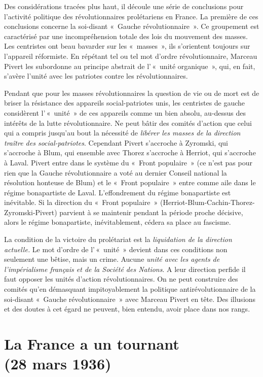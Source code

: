 \documentclass[french,twoside]{book} %
\newcommand\chapteropen{} %
\newcommand\chapterclose{} %
\begin{document}
Des considérations tracées plus haut, il découle une série de conclusions pour l’activité politique des révolutionnaires prolétariens en France. La première de ces conclusions concerne la soi-disant « Gauche révolutionnaire ». Ce groupement est caractérisé par une incompréhension totale des lois du mouvement des masses. Les centristes ont beau bavarder sur les « masses », ils s’orientent toujours sur l’appareil réformiste. En répétant tel ou tel mot d’ordre révolutionnaire, Marceau Pivert les subordonne au principe abstrait de l’ « unité organique », qui, en fait, s’avère l’unité avec les patriotes contre les révolutionnaires.\par
Pendant que pour les masses révolutionnaires la question de vie ou de mort est de briser la résistance des appareils social-patriotes unis, les centristes de gauche considèrent l’ « unité » de ces appareils comme un bien absolu, au-dessus des intérêts de la lutte révolutionnaire. Ne peut bâtir des comités d’action que celui qui a compris jusqu’au bout la nécessité de \emph{libérer les masses de la direction traître des social-patriotes}. Cependant Pivert s’accroche à Zyromski, qui s’accroche à Blum, qui ensemble avec Thorez s’accroche à Herriot, qui s’accroche à Laval. Pivert entre dans le système du « Front populaire » (ce n’est pas pour rien que la Gauche révolutionnaire a voté au dernier Conseil national la résolution honteuse de Blum) et le « Front populaire » entre comme aile dans le régime bonapartiste de Laval. L’effondrement du régime bonapartiste est inévitable. Si la direction du « Front populaire » (Herriot-Blum-Cachin-Thorez-Zyromski-Pivert) parvient à se maintenir pendant la période proche décisive, alors le régime bonapartiste, inévitablement, cédera sa place au fascisme.\par
 La condition de la victoire du prolétariat est la \emph{liquidation de la direction actuelle.} Le mot d’ordre de l’ « unité » devient dans ces conditions non seulement une bêtise, mais un crime. Aucune \emph{unité avec les agents de l’impérialisme français et de la Société des Nations}. A leur direction perfide il faut opposer les unités d’action révolutionnaires. On ne peut construire des comités qu’en démasquant impitoyablement la politique antirévolutionnaire de la soi-disant « Gauche révolutionnaire » avec Marceau Pivert en tête. Des illusions et des doutes à cet égard ne peuvent, bien entendu, avoir place dans nos rangs.
\chapterclose


\chapteropen
 \chapter[{La France a un tournant (28 mars 1936)}]{La France a un tournant\protect\footnotemark  \\
(28 mars 1936)}
\label{p5}\renewcommand{\leftmark}{La France a un tournant \\
(28 mars 1936)}
\end{document}
